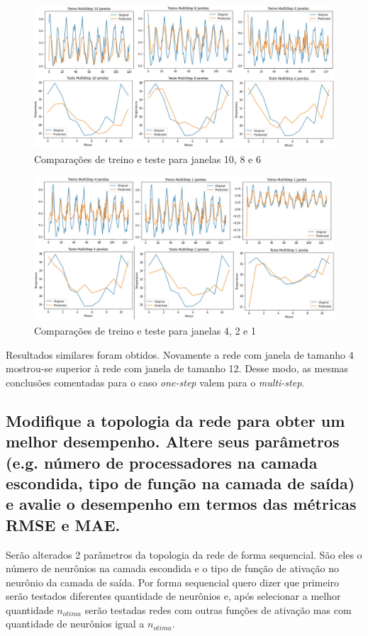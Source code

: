 \documentclass[12pt]{article}
\begin{document}
		\begin{figure}[H]
		\centering
		\includegraphics[width=0.9\linewidth]{Imagens/janelas/janelas6a10MULTI.jpg}
		\caption{Comparações de treino e teste para janelas 10, 8 e 6}
		\label{fig:janelas6a10MULTI}
	\end{figure}
	
	\begin{figure}[H]
		\centering
		\includegraphics[width=0.9\linewidth]{Imagens/janelas/janelas1a4MULTI.jpg}
		\caption{Comparações de treino e teste para janelas 4, 2 e 1}
		\label{fig:janelas1a4MULTI}
	\end{figure}

	Resultados similares foram obtidos. Novamente a rede com janela de tamanho 4 mostrou-se superior à rede com janela de tamanho 12. Desse modo, as mesmas conclusões comentadas para o caso \textit{one-step} valem para o \textit{multi-step}.
	
	\subsection{Modifique a topologia da rede para obter um melhor desempenho. Altere seus parâmetros (e.g. número de processadores na camada escondida, tipo de função na camada de saída) e avalie o desempenho em termos das métricas RMSE e MAE.}
	
	Serão alterados 2 parâmetros da topologia da rede de forma sequencial. São eles o número de neurônios na camada escondida e o tipo de função de ativação no neurônio da camada de saída. Por forma sequencial quero dizer que primeiro serão testados diferentes quantidade de neurônios e, após selecionar a melhor quantidade $n_{otima}$ serão testadas redes com outras funções de ativação mas com quantidade de neurônios igual a $n_{otima}$.
	
\end{document}
